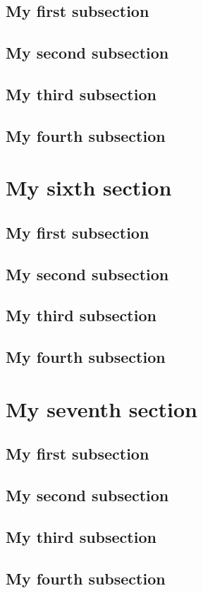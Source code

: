 \documentclass[fontsize=10pt,open=any,twocolumn]{scrbook}%
\begin{document}
            \subsection{My first subsection}
                \blindtext
            \subsection{My second subsection}
                \blindtext     
            \subsection{My third subsection}
                \blindtext
            \subsection{My fourth subsection}
                \blindtext  
        \section{My sixth section}
                \blindtext
            \subsection{My first subsection}
                \blindtext
            \subsection{My second subsection}
                \blindtext     
            \subsection{My third subsection}
                \blindtext
            \subsection{My fourth subsection}
                \blindtext    
        \section{My seventh section}
                \blindtext
            \subsection{My first subsection}
                \blindtext
            \subsection{My second subsection}
                \blindtext     
            \subsection{My third subsection}
                \blindtext
            \subsection{My fourth subsection}
                \blindtext           
\end{document}
